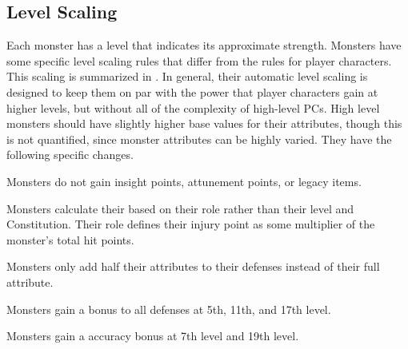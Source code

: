  \subsection{Level Scaling}
    Each monster has a level that indicates its approximate strength.
    Monsters have some specific level scaling rules that differ from the rules for player characters.
    This scaling is summarized in .
    In general, their automatic level scaling is designed to keep them on par with the power that player characters gain at higher levels, but without all of the complexity of high-level PCs.
    High level monsters should have slightly higher base values for their attributes, though this is not quantified, since monster attributes can be highly varied.
    They have the following specific changes.
    \begin{raggeditemize}
      \item Monsters do not gain insight points, attunement points, or legacy items.
      \item Monsters calculate their  based on their role rather than their level and Constitution.
        Their role defines their injury point as some multiplier of the monster's total hit points.
      \item Monsters only add half their attributes to their defenses instead of their full attribute.
      \item Monsters gain a  bonus to all defenses at 5th, 11th, and 17th level.
      \item Monsters gain a  accuracy bonus at 7th level and 19th level.
    \end{raggeditemize}

